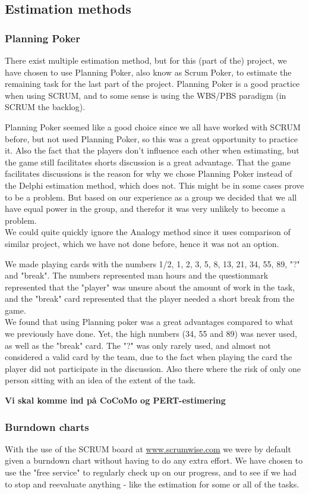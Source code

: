 \subsection{Estimation methods}
\subsubsection{Planning Poker}
There exist multiple estimation method, but for this (part of the) project, we have chosen to use Planning Poker, also know as Scrum Poker, to estimate the remaining task for the last part of the project. Planning Poker is a good practice when using SCRUM, and to some sense is using the WBS/PBS paradigm (in SCRUM the backlog).

Planning Poker seemed like a good choice since we all have worked with SCRUM before, but not used Planning Poker, so this was a great opportunity to practice it. Also the fact that the players don't influence each other when estimating, but the game still facilitates shorts discussion is a great advantage. That the game facilitates discussions is the reason for why we chose Planning Poker instead of the Delphi estimation method, which does not. This might be in some cases prove to be a problem. But based on our experience as a group we decided that we all have equal power in the group, and therefor it was very unlikely to become a problem. \\
We could quite quickly ignore the Analogy method since it uses comparison of similar project, which we have not done before, hence it was not an option.

We made playing cards with the numbers 1/2, 1, 2, 3, 5, 8, 13, 21, 34, 55, 89, "?" and "break". The numbers represented man hours and the questionmark represented that the "player" was unsure about the amount of work in the task, and the "break" card represented that the player needed a short break from the game.\\
We found that using Planning poker was a great advantages compared to what we previously have done. Yet, the high numbers (34, 55 and 89) was never used, as well as the "break" card. The "?" was only rarely used, and almost not considered a valid card by the team, due to the fact when playing the card the player did not participate in the discussion. Also there where the risk of only one person sitting with an idea of the extent of the task.

\textbf{Vi skal komme ind på CoCoMo og PERT-estimering}

\subsubsection{Burndown charts}
With the use of the SCRUM board at \url{www.scrumwise.com} we were by default given a burndown chart without having to do any extra effort. We have chosen to use the "free service" to regularly check up on our progress, and to see if we had to stop and reevaluate anything - like the estimation for some or all of the tasks.
